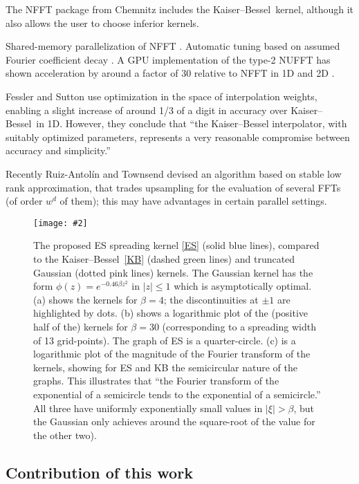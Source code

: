 \documentclass[10pt]{article}
\newcommand{\bfi}{\begin{figure}}
\newcommand{\efi}{\end{figure}}
\newcommand{\ca}[2]{\caption{#1 \label{#2}}}
\newcommand{\ig}[2]{\texttt{[image: \#2]}}
\newcommand{\KB}{Kaiser--Bessel}
\newcommand{\freq}{\beta}          %
\begin{document}
The NFFT package \cite{nfft} from Chemnitz
includes the \KB\ kernel, although it also allows the user to
choose inferior kernels.

Shared-memory parallelization of NFFT \cite{volkmer}.
Automatic tuning based on assumed Fourier coefficient decay \cite{nestler}.
A GPU implementation of the type-2 NUFFT has shown acceleration by around
a factor of 30 relative to NFFT in 1D and 2D \cite{cunfft}.

Fessler and Sutton \cite{fessler} use optimization in the space of
interpolation weights, enabling a slight increase of around 1/3 of a
digit in accuracy over \KB\ in 1D. However, they conclude that
``the
Kaiser--Bessel interpolator, with suitably optimized parameters,
represents a very reasonable compromise between accuracy and
simplicity.''

Recently Ruiz-Antol\'in and Townsend
\cite{townsendnufft} devised an algorithm
based on stable low rank approximation, that
trades upsampling for the evaluation of several FFTs (of order $w^d$ of them);
this may have advantages in certain parallel settings.



\bfi[t]  %
\hspace{-2ex}\ig{width=6.7in}{kernel.eps}
\ca{The proposed ES spreading kernel
  \eqref{ES} (solid blue lines), compared to the \KB\ \eqref{KB}
  (dashed green lines) and truncated Gaussian (dotted pink lines) kernels.
  The Gaussian kernel has the form $\phi(z) = e^{-0.46 \beta z^2}$ in $|z|\le 1$
  which is asymptotically optimal.
  (a) shows the kernels for $\freq=4$; the discontinuities at
  $\pm 1$ are highlighted by dots.
  (b) shows a logarithmic plot of the (positive half of the)
  kernels for $\freq=30$
  (corresponding to a spreading width of 13 grid-points).
  The graph of ES is a quarter-circle.
  (c) is a logarithmic plot of the magnitude of the
  Fourier transform of the kernels,
  showing for ES and KB the semicircular nature of the graphs.
  This illustrates that ``the Fourier transform of the exponential
  of a semicircle tends to the exponential of a semicircle.''
  All three have uniformly exponentially
  small values in $|\xi|>\freq$, but the Gaussian only achieves around
  the square-root of the value for the other two).
}{f:kernel}
\efi


\subsection{Contribution of this work}
\end{document}
